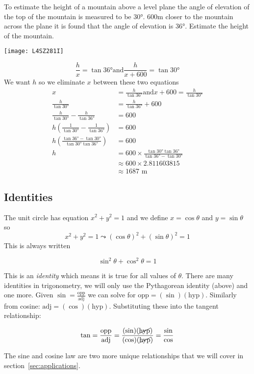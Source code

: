 \clearpage\example To estimate the height of a mountain above a level plane the angle of elevation of the top of the mountain is measured to be $\ang{30} $. $600 \mbox{m}$ closer to the mountain across the plane it is found that the angle of elevation is $\ang{36} $. Estimate the height of the mountain. \\
\begin{center}\texttt{[image: L4SZ281I]}\end{center}
\solution
\begin{equation*}\frac{h}{x} =\tan  \ang{36} \text{and}\frac{h}{x +600} =\tan  \ang{30} 
\end{equation*}
We want $h$ so we eliminate $x$ between these two equations
\begin{align*}x &  =  \frac{h}{\tan  \ang{36} }\text{and}x +600 =\frac{h}{\tan  \ang{30} } \\
\frac{h}{\tan  \ang{30} } &  =  \frac{h}{\tan  \ang{36} } +600 \\
\frac{h}{\tan  \ang{30} } -\frac{h}{\tan  \ang{36} } &  =  600 \\
h \left (\frac{1}{\tan  \ang{30} } -\frac{1}{\tan  \ang{36} }\right ) &  =  600 \\
h \genfrac{(}{)}{}{}{\tan  \ang{36}  -\tan  \ang{30} }{\tan  \ang{30}  \tan  \ang{36} } &  =  600 \\
h &  =  600 \times \frac{\tan  \ang{30}  \tan  \ang{36} }{\tan  \ang{36}  -\tan  \ang{30} } \\
 &  \approx   600 \times 2.811603815 \\
 &  \approx   1687 \mbox{ m}\end{align*}

\subsection*{Identities}\label{sec:identities}
The unit circle has equation $x^{2} +y^{2} =1$ and we define $x =\cos  \theta$ and $y =\sin  \theta$ so
\begin{equation*}x^{2} +y^{2} =1 \leadsto \left (\cos  \theta\right )^{2} +\left (\sin  \theta\right )^{2} =1
\end{equation*}
This is always written
\begin{tcolorbox}\[\sin ^{2} \theta +\cos ^{2} \theta =1\]
\end{tcolorbox}
This is an \emph{identity} which means it is true for all values of $\theta$. There are many identities in trigonometry, we will only use the Pythagorean identity (above) and one more.
Given $\sin =\frac{\text{opp}}{\text{adj}}$ we can solve for $\text{opp}=(\sin)(\text{hyp})$. Similarly from cosine:  $\text{adj}=(\cos)(\text{hyp})$. Substituting these into the tangent relationship:
\begin{tcolorbox}\[\tan=\frac{\text{opp}}{\text{adj}}=\frac{(\sin)(\cancel{\text{hyp}})}{(\cos)(\cancel{\text{hyp}})}=\frac{\sin}{\cos}\]
\end{tcolorbox}
The sine and cosine law are two more unique relationships that we will cover in section~\ref{sec:applications}.

